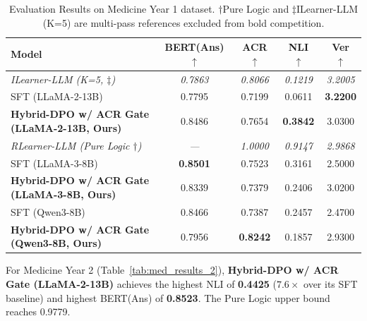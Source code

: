 \begin{table}[h]
\centering
\small
\begin{tabular}{l|c|c|c|c}
\toprule
Model & BERT(Ans) $\uparrow$ & ACR $\uparrow$ & NLI $\uparrow$ & Ver $\uparrow$ \\
\midrule
\textit{ILearner-LLM (K=5, $\ddagger$)} & \textit{0.7863} & \textit{0.8066} & \textit{0.1219} & \textit{3.2005} \\
\midrule
SFT (LLaMA-2-13B) & 0.7795 & 0.7199 & 0.0611 & \textbf{3.2200} \\
\textbf{Hybrid-DPO w/ ACR Gate (LLaMA-2-13B, Ours)} & 0.8486 & 0.7654 & \textbf{0.3842} & 3.0300 \\
\textit{RLearner-LLM (Pure Logic $\dagger$)} & \textit{---} & \textit{1.0000} & \textit{0.9147} & \textit{2.9868} \\
\midrule
SFT (LLaMA-3-8B) & \textbf{0.8501} & 0.7523 & 0.3161 & 2.5000 \\
\textbf{Hybrid-DPO w/ ACR Gate (LLaMA-3-8B, Ours)} & 0.8339 & 0.7379 & 0.2406 & 3.0200 \\
\midrule
SFT (Qwen3-8B) & 0.8466 & 0.7387 & 0.2457 & 2.4700 \\
\textbf{Hybrid-DPO w/ ACR Gate (Qwen3-8B, Ours)} & 0.7956 & \textbf{0.8242} & 0.1857 & 2.9300 \\
\bottomrule
\end{tabular}
\caption{Evaluation Results on Medicine Year 1 dataset. $\dagger$Pure Logic and $\ddagger$ILearner-LLM (K=5) are multi-pass references excluded from bold competition.}
\label{tab:med_results_1}
\end{table}

For Medicine Year 2 (Table~\ref{tab:med_results_2}), \textbf{Hybrid-DPO w/ ACR Gate (LLaMA-2-13B)} achieves the highest NLI of \textbf{0.4425} ($7.6\times$ over its SFT baseline) and highest BERT(Ans) of \textbf{0.8523}. The Pure Logic upper bound reaches 0.9779.

